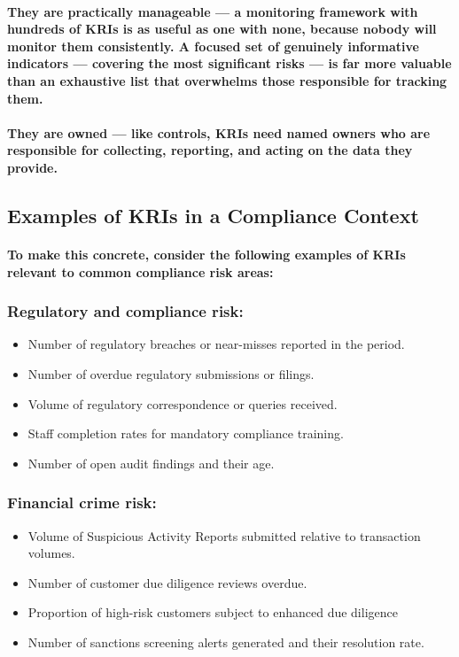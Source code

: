 \paragraph{\textbf{They are practically manageable} — a monitoring framework with hundreds of KRIs is as useful as one with none, because nobody will monitor them consistently. A focused set of genuinely informative indicators — covering the most significant risks — is far more valuable than an exhaustive list that overwhelms those responsible for tracking them.}
\paragraph{\textbf{They are owned} — like controls, KRIs need named owners who are responsible for collecting, reporting, and acting on the data they provide.}

\subsection{Examples of KRIs in a Compliance Context}
\paragraph{To make this concrete, consider the following examples of KRIs relevant to common compliance risk areas:}
\subsubsection{Regulatory and compliance risk:}
\begin{itemize}
    \item{Number of regulatory breaches or near-misses reported in the period.}
    \item{Number of overdue regulatory submissions or filings.}
    \item{Volume of regulatory correspondence or queries received.}
    \item{Staff completion rates for mandatory compliance training.}
    \item{Number of open audit findings and their age.}
\end{itemize}
\subsubsection{Financial crime risk:}
\begin{itemize}
    \item{Volume of Suspicious Activity Reports submitted relative to transaction volumes.}
    \item{Number of customer due diligence reviews overdue.}
    \item{Proportion of high-risk customers subject to enhanced due diligence}
    \item{Number of sanctions screening alerts generated and their resolution rate.}
\end{itemize}
